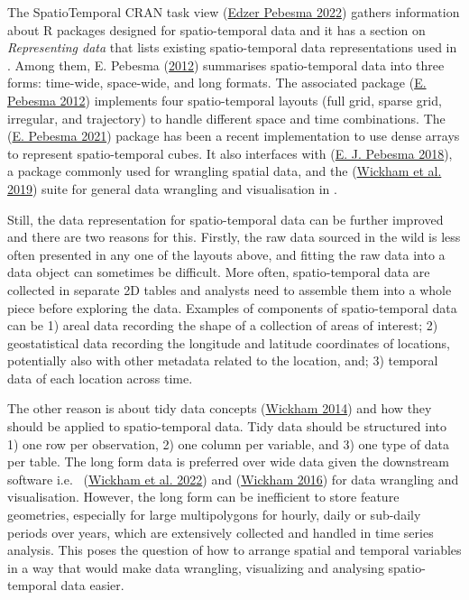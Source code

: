 \documentclass{article}
\begin{document}
The SpatioTemporal CRAN task view (\protect\hyperlink{ref-ctvspatiotemporal}{Edzer Pebesma 2022}) gathers information about R packages designed for spatio-temporal data and it has a section on \emph{Representing data} that lists existing spatio-temporal data representations used in . Among them, E. Pebesma (\protect\hyperlink{ref-spacetime}{2012}) summarises spatio-temporal data into three forms: time-wide, space-wide, and long formats. The associated package  (\protect\hyperlink{ref-spacetime}{E. Pebesma 2012}) implements four spatio-temporal layouts (full grid, sparse grid, irregular, and trajectory) to handle different space and time combinations. The  (\protect\hyperlink{ref-stars}{E. Pebesma 2021}) package has been a recent implementation to use dense arrays to represent spatio-temporal cubes. It also interfaces with  (\protect\hyperlink{ref-sf}{E. J. Pebesma 2018}), a package commonly used for wrangling spatial data, and the  (\protect\hyperlink{ref-tidyverse}{Wickham et al. 2019}) suite for general data wrangling and visualisation in .

Still, the data representation for spatio-temporal data can be further improved and there are two reasons for this. Firstly, the raw data sourced in the wild is less often presented in any one of the layouts above, and fitting the raw data into a data object can sometimes be difficult. More often, spatio-temporal data are collected in separate 2D tables and analysts need to assemble them into a whole piece before exploring the data. Examples of components of spatio-temporal data can be 1) areal data recording the shape of a collection of areas of interest; 2) geostatistical data recording the longitude and latitude coordinates of locations, potentially also with other metadata related to the location, and; 3) temporal data of each location across time.

The other reason is about tidy data concepts (\protect\hyperlink{ref-tidydata}{Wickham 2014}) and how they should be applied to spatio-temporal data. Tidy data should be structured into 1) one row per observation, 2) one column per variable, and 3) one type of data per table. The long form data is preferred over wide data given the downstream software i.e.~ (\protect\hyperlink{ref-dplyr}{Wickham et al. 2022}) and  (\protect\hyperlink{ref-ggplot2}{Wickham 2016}) for data wrangling and visualisation. However, the long form can be inefficient to store feature geometries, especially for large multipolygons for hourly, daily or sub-daily periods over years, which are extensively collected and handled in time series analysis. This poses the question of how to arrange spatial and temporal variables in a way that would make data wrangling, visualizing and analysing spatio-temporal data easier.
\end{document}
